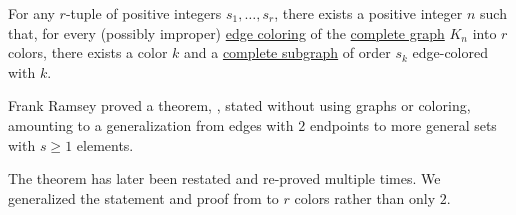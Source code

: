 \begin{theorem}\label{thm:ramseys_theorem}
  For any \( r \)-tuple of positive integers \( s_1, \ldots, s_r \), there exists a positive integer \( n \) such that, for every (possibly improper) \hyperref[def:graph_coloring]{edge coloring} of the \hyperref[def:complete_graph]{complete graph} \( K_n \) into \( r \) colors, there exists a color \( k \) and a \hyperref[def:complete_subgraph]{complete subgraph} of order \( s_k \) edge-colored with \( k \).
\end{theorem}
\begin{comments}
  \item Frank Ramsey proved a theorem, \cite[thm. B]{Ramsey1930}, stated without using graphs or coloring, amounting to a generalization from edges with \( 2 \) endpoints to more general sets with \( s \geq 1 \) elements.

  The theorem has later been restated and re-proved multiple times. We generalized the statement and proof from  to \( r \) colors rather than only \( 2 \).
\end{comments}
